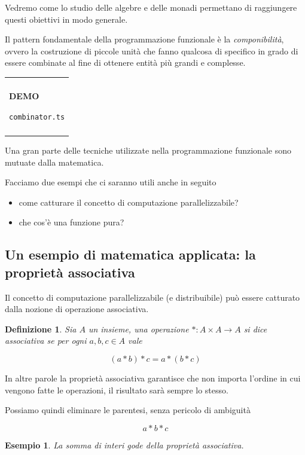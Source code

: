\documentclass[12pt]{article}
\newtheorem{definition}{Definizione}
\newtheorem{example}{Esempio}
\newenvironment{boxed}
    {\begin{center}
    \begin{tabular}{|p{0.9\textwidth}|}
    \hline\\
    }
    {
    \\\\\hline
    \end{tabular}
    \end{center}
    }
\begin{document}
Vedremo come lo studio delle algebre e delle monadi permettano di raggiungere questi obiettivi in modo generale.

Il pattern fondamentale della programmazione funzionale è la \emph{componibilità}, ovvero la costruzione di piccole unità
che fanno qualcosa di specifico in grado di essere combinate al fine di ottenere entità più grandi e complesse.

\begin{boxed}
\begin{center}
\textbf{DEMO}

\texttt{combinator.ts}
\end{center}
\end{boxed}

Una gran parte delle tecniche utilizzate nella programmazione funzionale sono mutuate dalla matematica.

Facciamo due esempi che ci saranno utili anche in seguito

\begin{itemize}
  \item come catturare il concetto di computazione parallelizzabile?
  \item che cos'è una funzione pura?
\end{itemize}

\subsection{Un esempio di matematica applicata: la proprietà associativa}

Il concetto di computazione parallelizzabile (e distribuibile) può essere catturato dalla nozione di operazione associativa.

\begin{definition}
Sia $A$ un insieme, una operazione $*: A \times A \rightarrow A$ si dice \emph{associativa} se per ogni $a, b, c \in A$ vale

$$
(a * b) * c = a * ( b * c )
$$
\end{definition}

In altre parole la proprietà associativa garantisce che non importa l'ordine in cui vengono fatte le operazioni, il risultato sarà sempre lo stesso.

Possiamo quindi eliminare le parentesi, senza pericolo di ambiguità

$$
a * b * c
$$

\begin{example}
La somma di interi gode della proprietà associativa.
\end{example}
\end{document}

